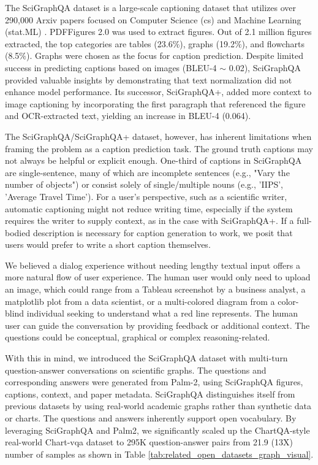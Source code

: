\documentclass{article}
\begin{document}
The SciGraphQA dataset is a large-scale captioning dataset that utilizes over 290,000 Arxiv papers focused on Computer Science (cs) and Machine Learning (stat.ML) \cite{hsu2021scicap}. PDFFigures 2.0 was used to extract figures. Out of 2.1 million figures extracted, the top categories are tables (23.6$\%$), graphs (19.2$\%$), and flowcharts (8.5$\%$). Graphs were chosen as the focus for caption prediction. Despite limited success in predicting captions based on images (BLEU-4 $\sim$ 0.02), SciGraphQA provided valuable insights by demonstrating that text normalization did not enhance model performance. Its successor, SciGraphQA+, added more context to image captioning by incorporating the first paragraph that referenced the figure and OCR-extracted text, yielding an increase in BLEU-4 (0.064).

The SciGraphQA/SciGraphQA+ dataset, however, has inherent limitations when framing the problem as a caption prediction task. The ground truth captions may not always be helpful or explicit enough. One-third of captions in SciGraphQA are single-sentence, many of which are incomplete sentences (e.g., "Vary the number of objects") or consist solely of single/multiple nouns (e.g., 'IIPS', 'Average Travel Time'). For a user's perspective, such as a scientific writer, automatic captioning might not reduce writing time, especially if the system requires the writer to supply context, as in the case with SciGraphQA+. If a full-bodied description is necessary for caption generation to work, we posit that users would prefer to write a short caption themselves.

 We believed a dialog experience without needing lengthy textual input offers a more natural flow of user experience. The human user would only need to upload an image, which could range from a Tableau screenshot by a business analyst, a matplotlib plot from a data scientist, or a multi-colored diagram from a color-blind individual seeking to understand what a red line represents. The human user can guide the conversation by providing feedback or additional context. The questions could be conceptual, graphical or complex reasoning-related. 

With this in mind, we introduced the SciGraphQA dataset with multi-turn question-answer conversations on scientific graphs. The questions and corresponding answers were generated from Palm-2, using SciGraphQA figures, captions, context, and paper metadata. SciGraphQA distinguishes itself from previous datasets by using real-world academic graphs rather than synthetic data or charts. The questions and answers inherently support open vocabulary. By leveraging SciGraphQA and Palm2, we significantly scaled up the ChartQA-style real-world Chart-vqa dataset to 295K question-answer pairs from 21.9 (13X) number of samples as shown in Table \ref{tab:related_open_datasets_graph_visual}. 
\end{document}
